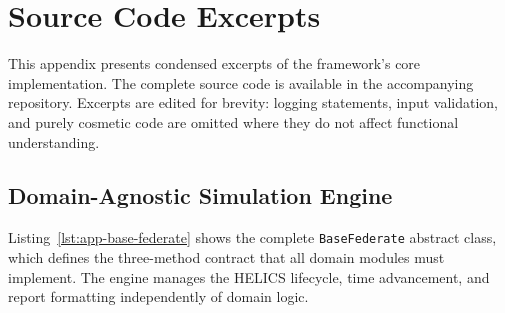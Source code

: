\chapter{Source Code Excerpts}
\label{appendix:code}

This appendix presents condensed excerpts of the framework's core implementation. The complete source code is available in the accompanying repository. Excerpts are edited for brevity: logging statements, input validation, and purely cosmetic code are omitted where they do not affect functional understanding.

\section{Domain-Agnostic Simulation Engine}
\label{sec:code-engine}

Listing~\ref{lst:app-base-federate} shows the complete \texttt{BaseFederate} abstract class, which defines the three-method contract that all domain modules must implement. The engine manages the HELICS lifecycle, time advancement, and report formatting independently of domain logic.

